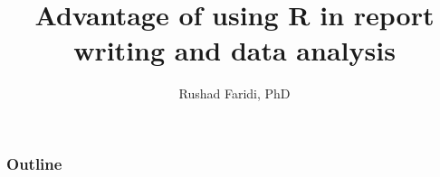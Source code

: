 \documentclass[t]{beamer}
\title{Advantage of using R in report writing and data analysis}
\author{Rushad Faridi, PhD}
\institute{University of Dhaka}
\renewcommand{\itemize}[1][<+(1)->]{\olditemize[#1]}
\begin{document}
\renewcommand{\itemize}[1][<+(1)->]{\olditemize[#1]}
\begin{frame}
\titlepage
\end{frame}

\begin{frame}
\frametitle{Outline}
\tableofcontents
\end{frame}


\end{document}
